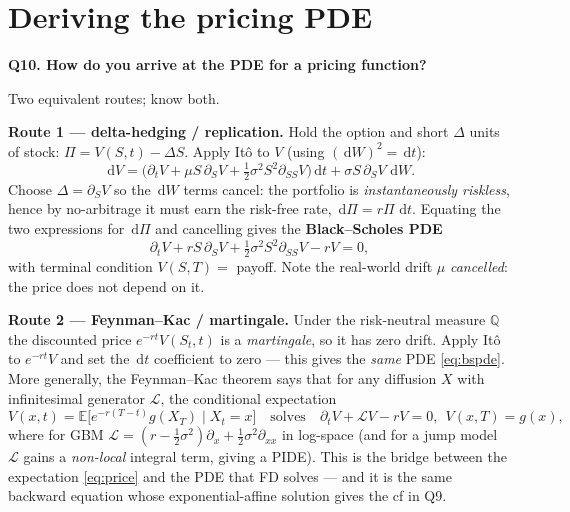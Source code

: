\documentclass[11pt]{article}
\newcommand{\E}{\mathbb{E}}
\newcommand{\Q}{\mathbb{Q}}
\newcommand{\dd}{\,\mathrm{d}}
\newcommand{\Lop}{\mathcal{L}}
\newcommand{\Qhead}[1]{\bigskip\noindent\textbf{\large #1}\par\nobreak\smallskip}
\begin{document}
\section{Deriving the pricing PDE}
\Qhead{Q10. How do you arrive at the PDE for a pricing function?}
Two equivalent routes; know both.

\textbf{Route 1 --- delta-hedging / replication.} Hold the option and short $\Delta$ units of stock:
$\Pi=V(S,t)-\Delta S$. Apply It\^o to $V$ (using $(\dd W)^2=\dd t$):
\[
\dd V=\Big(\partial_tV+\mu S\,\partial_S V+\tfrac12\sigma^2S^2\partial_{SS}V\Big)\dd t+\sigma S\,\partial_S V\,\dd W .
\]
Choose $\Delta=\partial_S V$ so the $\dd W$ terms cancel: the portfolio is \emph{instantaneously riskless},
hence by no-arbitrage it must earn the risk-free rate, $\dd\Pi=r\Pi\,\dd t$. Equating the two expressions for
$\dd\Pi$ and cancelling gives the \textbf{Black--Scholes PDE}
\begin{equation}\label{eq:bspde}
\partial_t V+rS\,\partial_S V+\tfrac12\sigma^2S^2\partial_{SS}V-rV=0 ,
\end{equation}
with terminal condition $V(S,T)=$ payoff. Note the real-world drift $\mu$ \emph{cancelled}: the price does not
depend on it.

\textbf{Route 2 --- Feynman--Kac / martingale.} Under the risk-neutral measure $\Q$ the discounted price
$e^{-rt}V(S_t,t)$ is a \emph{martingale}, so it has zero drift. Apply It\^o to $e^{-rt}V$ and set the $\dd t$
coefficient to zero --- this gives the \emph{same} PDE \eqref{eq:bspde}. More generally, the Feynman--Kac
theorem says that for any diffusion $X$ with infinitesimal generator $\Lop$, the conditional expectation
\[
V(x,t)=\E\big[e^{-r(T-t)}g(X_T)\mid X_t=x\big]
\quad\text{solves}\quad
\partial_t V+\Lop V-rV=0,\ \ V(x,T)=g(x),
\]
where for GBM $\Lop=(r-\tfrac12\sigma^2)\partial_x+\tfrac12\sigma^2\partial_{xx}$ in log-space (and for a
jump model $\Lop$ gains a \emph{non-local} integral term, giving a PIDE). This is the bridge between the
expectation \eqref{eq:price} and the PDE that FD solves --- and it is the same backward equation whose
exponential-affine solution gives the cf in Q9.

\end{document}
